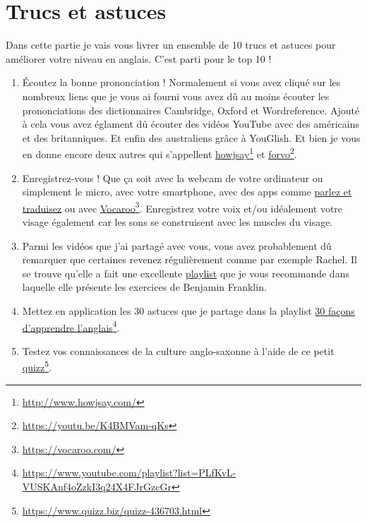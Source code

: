 \chapter{Trucs et astuces}

Dans cette partie je vais vous livrer un ensemble de 10 trucs et astuces
pour améliorer votre niveau en anglais. C'est parti pour le top 10 !

\begin{enumerate}
  \item \'Ecoutez la bonne prononciation ! Normalement si vous avez
  cliqué sur les nombreux liens que je vous ai fourni vous avez dû au
  moins écouter les prononciations des dictionnaires Cambridge, Oxford
  et Wordreference. Ajouté à cela vous avez églament dû écouter des
  vidéos YouTube avec des américains et des britanniques. Et enfin des
  australiens grâce à YouGlish. Et bien je vous en donne encore deux autres qui
  s'appellent \href{http://www.howjsay.com/}{howjsay}\footnote{\url{http://www.howjsay.com/}}
  et \href{https://youtu.be/K4BMVam-qKs}{forvo}\footnote{\url{https://youtu.be/K4BMVam-qKs}}.
  \item Enregistrez-vous ! Que ça soit avec la webcam de votre
  ordinateur ou simplement le micro, avec votre smartphone, avec des
  apps comme \href{https://itunes.apple.com/fr/app/parlez-traduisez-traducteur/id804641004?mt=8}{parlez et traduisez} ou avec
  \href{https://vocaroo.com/}{Vocaroo}\footnote{\url{https://vocaroo.com/}}.
  Enregistrez votre voix et/ou idéalement votre visage également car
  les sons se construisent avec les muscles du visage.
  \item Parmi les vidéos que j'ai partagé avec vous, vous avez
    probablement dû remarquer que certaines revenez régulièrement
    comme par exemple Rachel. Il se trouve qu'elle a fait une
    excellente
    \href{https://www.youtube.com/playlist?list=PL27A5D7DE7D02373A}{playlist}
    que je vous recommande dans laquelle elle présente les exercices
    de Benjamin Franklin.
  \item Mettez en application les 30 astuces que je partage dans la
    playlist \href{https://www.youtube.com/playlist?list=PLfKvL-VUSKAnf4oZzkI3q24X4FJrGzcGr}{30 façons d'apprendre l'anglais}\footnote{\url{https://www.youtube.com/playlist?list=PLfKvL-VUSKAnf4oZzkI3q24X4FJrGzcGr}}.
  \item Testez vos connaissances de la culture anglo-saxonne à l'aide
    de ce petit \href{https://www.quizz.biz/quizz-436703.html}{quizz}\footnote{\url{https://www.quizz.biz/quizz-436703.html}}.

\end{enumerate}

